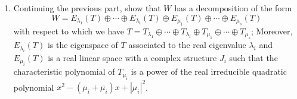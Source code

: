 \begin{problem}
\begin{enumerate}
	\item Continuing the previous part, show that $W$ has a decomposition of the form
	      \[
		      W = E_{\lambda_1} (T) \oplus \cdots \oplus E_{\lambda_t} (T) \oplus E_{\mu_1} (T) \oplus \cdots \oplus E_{\mu_s} (T)
	      \]
	      with respect to which we have $T = T_{\lambda_1} \oplus \cdots \oplus T_{\lambda_t} \oplus T_{\mu_1} \oplus \cdots \oplus T_{\mu_s}$; Moreover, $E_{\lambda_i} (T)$ is the eigenspace of $T$ associated to the real eigenvalue $\lambda_i$ and $E_{\mu_i} (T)$ is a real linear space with a complex structure $J_i$ such that the characteristic polynomial of $T_{\mu_i}$ is a power of the real irreducible quadratic polynomial $x^2 - (\mu_i + \overline{\mu_i}) x + |\mu_i|^2$.
\end{enumerate}
\end{problem}

